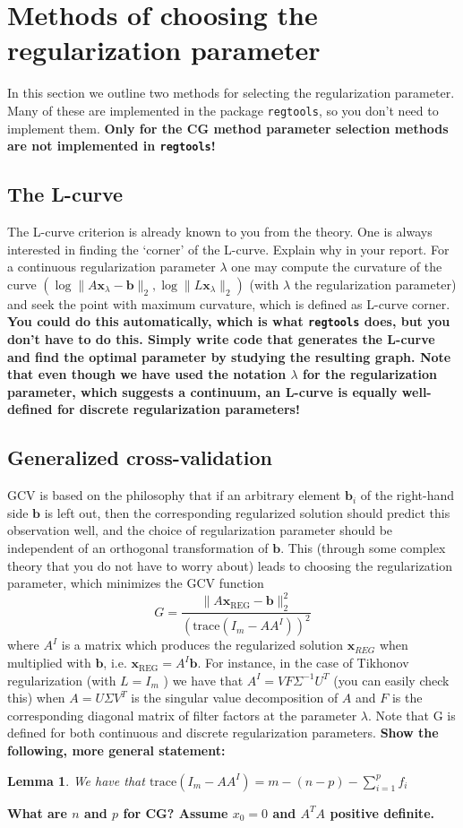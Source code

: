 \documentclass[12pt]{article}
\newtheorem{lemma}{Lemma}
\newcommand{\mbf}[1]{\mathbf{#1}}
\begin{document}
\section{Methods of choosing the regularization parameter}
In this section we outline two methods for selecting the regularization parameter. Many of these are implemented in the package \texttt{regtools}, so you don't need to implement them. \textbf{Only for the CG method parameter selection methods are not implemented in \texttt{regtools}!}
\subsection{The L-curve}
The L-curve criterion is already known to you from the theory. One is always interested in finding the
`corner’ of the L-curve. Explain why in your report. For a continuous regularization parameter $\lambda$ one may compute the curvature of the curve $(\log \|A\mbf{x}_{\lambda} - \mbf{b}\|_2 , \log \|L\mbf{x}_{\lambda}\|_2 )$ (with $\lambda$ the regularization
parameter) and seek the point with maximum curvature, which is defined as L-curve corner. \textbf{You could do this automatically, which is what \texttt{regtools} does, but you don't have to do this. Simply write code that generates the L-curve and find the optimal parameter by studying the resulting graph. Note that even though we have used the notation $\lambda$ for the regularization parameter, which suggests a continuum, an L-curve is equally well-defined for discrete regularization parameters!}
\subsection{Generalized cross-validation}
GCV is based on the philosophy that if an arbitrary element $\mbf{b}_i$ of the right-hand side $\mbf{b}$ is left out, then the corresponding regularized solution should predict this observation well, and the choice of
regularization parameter should be independent of an orthogonal transformation of $\mbf{b}$. This (through some complex theory that you do not have to worry about) leads to choosing the regularization parameter, which minimizes the GCV function
$$G =\frac{\|A\mbf{x}_{\text{REG}} - \mbf{b}\|_2^2}{(\text{trace}(I_m - AA^I ))^2}$$
where $A^I$ is a matrix which produces the regularized solution $\mbf{x}_{REG}$ when multiplied with $\mbf{b}$, i.e.
$\mbf{x}_{\text{REG}} = A^I \mbf{b}$. For instance, in the case of Tikhonov regularization (with $L = I_m$ ) we have that
$A^I = V F \Sigma^{-1}U^T$ (you can easily check this) when $A = U \Sigma V^T$ is the singular value decomposition of $A$ and $F$ is the corresponding diagonal matrix of filter factors at the parameter $\lambda$. Note that G
is defined for both continuous and discrete regularization parameters. \textbf{Show the following, more general statement:}
\begin{lemma}
We have that $\text{trace}(I_m - AA^I ) = m - (n -p) - \sum_{i=1}^p f_i$
\end{lemma}
\textbf{What are $n$ and $p$ for CG? Assume $x_0=0$ and $A^TA$ positive definite.}
\end{document}

